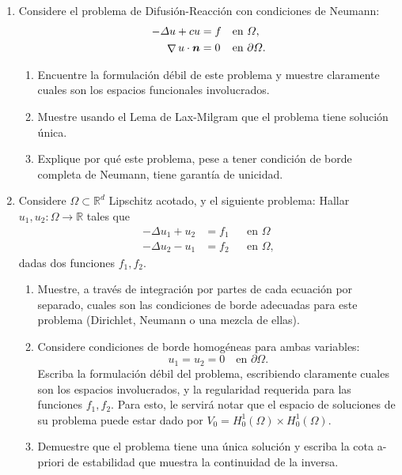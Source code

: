 \documentclass{article}
\renewcommand{\vec}{\vectorsym}
\DeclareMathOperator{\grad}{\nabla}
\newcommand{\R}{\mathbb{R}}
\begin{document}
\begin{enumerate}
       \item Considere el problema de Difusión-Reacción con condiciones de Neumann:
            $$ 
            \begin{aligned}
                -\Delta u + cu &= f &&\text{en $\Omega$},\\
                \grad u\cdot \vec n &= 0 &&\text{en $\partial\Omega$}.
            \end{aligned}
            $$
            \begin{enumerate}
                \item Encuentre la formulación débil de este problema y muestre claramente cuales son los espacios funcionales involucrados.
                \item Muestre usando el Lema de Lax-Milgram que el problema tiene solución única. 
                \item Explique por qué este problema, pese a tener condición de borde completa de Neumann, tiene garantía de unicidad.
            \end{enumerate}
        \item Considere $\Omega\subset \R^d$ Lipschitz acotado, y el siguiente problema: Hallar $u_1, u_2:\Omega \to \R$  tales que
            $$ 
            \begin{aligned}
                -\Delta u_1 + u_2 &= f_1  && \text{en $\Omega$} \\
                -\Delta u_2 - u_1 &= f_2  && \text{en $\Omega$},
            \end{aligned}
            $$
            dadas dos funciones $f_1,f_2$. 
            \begin{enumerate}
                \item Muestre, a través de integración por partes de cada ecuación por separado, cuales son las condiciones de borde adecuadas para este problema (Dirichlet, Neumann o una mezcla de ellas). 
                \item Considere condiciones de borde homogéneas para ambas variables: 
                        $$ u_1 = u_2 = 0 \quad\text{en $\partial\Omega$}. $$
                       Escriba la formulación débil del problema, escribiendo claramente cuales son los espacios involucrados, y la regularidad requerida para las funciones $f_1, f_2$. Para esto, le servirá notar que el espacio de soluciones de su problema puede estar dado por $V_0 = H_0^1(\Omega)\times H_0^1(\Omega)$. 
                   \item Demuestre que el problema tiene una única solución y escriba la cota a-priori de estabilidad que muestra la continuidad de la inversa. 
            \end{enumerate}
\end{enumerate}

\end{document}
